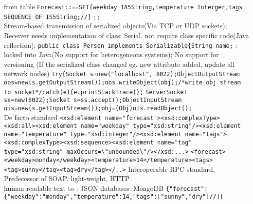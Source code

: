 from table
\lstinline{Forecast::==SET{weekday IA5String,temperature Interger,tags SEQUENCE OF IS5String;//]}
;
;
%
%
%
\\
Stream-based transmission of serialized objects(Via TCP or UDP sockets);
Receiver needs implementation of class;
Serial. not require class specific code(Java reflection);
\textbar
\lstinline{public class Person implements Serializable{String name;}
\btext{--}:
locked into Java(No support for heterogeneous systems);
No support for versioning
(If the serialized class changed eg. new attribute added, update all network nodes)
\lstinline{try{Socket s=new("localhost", 8022);ObjectOutputStream oos=new(s.getOutputStream());oos.writeObject(obj);/*write obj stream to socket*/catch(e){e.printStackTrace();}
\lstinline{ServerSocket ss=new(8022);Socket s=ss.accept();ObjectInputStream ois=new(s.getInputStream());obj=(Obj)ois.readObject();}
%
%
%
\\
De facto standard
\lstinline{<xsd:element name="forecast"><xsd:complexType><xsd:all><xsd:element name="weekday" type="xsd:string"/><xsd:element name="temperature" type="xsd:integer"/><xsd:element name="tags"><xsd:complexType><xsd:sequence><xsd:element name="tag" type="xsd:string" maxOccurs=\"unbounded\"/></xsd:...>}
\lstinline{<forecast><weekday>monday</weekday><temperature>14</temperature><tags><tag>sunny</tag><tag>dry</tag></..>}
Interoperable RPC standard,
Predecessor of SOAP,
light-weight,
HTTP
%
%
%
\\
human readable text to ;
JSON databases: MongoDB
\lstinline{{"forecast":{"weekday":"monday","temperature":14,"tags":["sunny","dry"]//]]}
